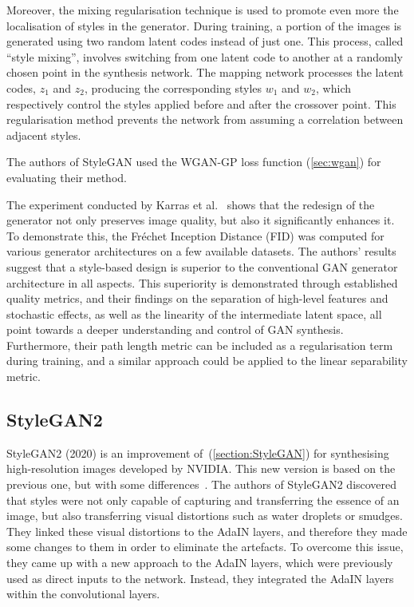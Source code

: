 \noindent Moreover, the mixing regularisation technique is used to promote even more the localisation of styles in the generator. During training, a portion of the images is generated using two random latent codes instead of just one. This process, called “style mixing”, involves switching from one latent code to another at a randomly chosen point in the synthesis network. The mapping network processes the latent codes, $z_1$ and $z_2$, producing the corresponding styles $w_1$ and $w_2$, which respectively control the styles applied before and after the crossover point. This regularisation method prevents the network from assuming a correlation between adjacent styles. 

%
\noindent The authors of StyleGAN used the WGAN-GP loss function (\ref{sec:wgan}) for evaluating their method.

\noindent The experiment conducted by Karras et al.~\cite{StyleGAN} shows that the redesign of the generator not only preserves image quality, but also it significantly enhances it. To demonstrate this, the Fréchet Inception Distance (FID) was computed for various generator architectures on a few available datasets.
The authors' results suggest that a style-based design is superior to the conventional GAN generator architecture in all aspects.
This superiority is demonstrated through established quality metrics, and their findings on the separation of high-level features and stochastic effects, as well as the linearity of the intermediate latent space, all point towards a deeper understanding and control of GAN synthesis.
Furthermore, their path length metric can be included as a regularisation term during training, and a similar approach could be applied to the linear separability metric.

\subsection{StyleGAN2}
\label{section:StyleGAN2}
StyleGAN2 (2020) is an improvement of~(\ref{section:StyleGAN}) for synthesising high-resolution images developed by NVIDIA. This new version is based on the previous one, but with some differences~\cite{Karras2019stylegan2}.
The authors of StyleGAN2 discovered that styles were not only capable of capturing and transferring the essence of an image, but also transferring visual distortions such as water droplets or smudges.
They linked these visual distortions to the AdaIN layers, and therefore they made some changes to them in order to eliminate the artefacts. 
To overcome this issue, they came up with a new approach to the AdaIN layers, which were previously used as direct inputs to the network. Instead, they integrated the AdaIN layers within the convolutional layers.


